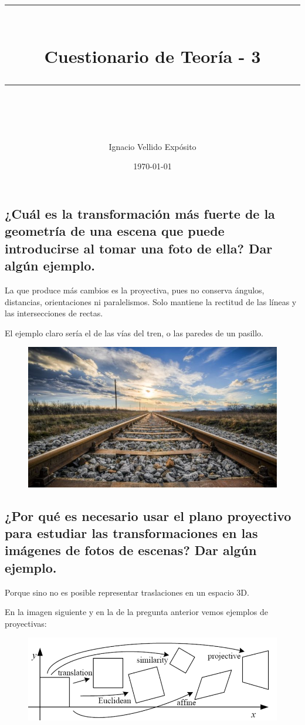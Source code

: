 \documentclass[11pt]{scrartcl} %
\title{	
	\normalfont\normalsize	
	\rule{\linewidth}{0.5pt}\\ %
	\vspace{20pt} %
	{\huge Cuestionario de Teoría - 3}\\ %
	\vspace{12pt} %
	\rule{\linewidth}{2pt}\\ %
	\vspace{12pt} %
}
\author{\LARGE Ignacio Vellido Expósito} %
\date{\normalsize\today} %
\begin{document}
\maketitle %

\subsection{¿Cuál es la transformación más fuerte de la geometría de una escena 
que puede introducirse al tomar una foto de ella? Dar algún ejemplo.}


La que produce más cambios es la proyectiva, pues no conserva ángulos, 
distancias, orientaciones ni paralelismos. 
Solo mantiene la rectitud de las líneas y las intersecciones de rectas. \newline

El ejemplo claro sería el de las vías del tren, o las paredes de un pasillo.

\begin{figure}[h]
	\centering
	\includegraphics[width=0.5\columnwidth]{1.jpeg}
\end{figure}

\subsection{¿Por qué es necesario usar el plano proyectivo para estudiar las 
transformaciones en las imágenes de fotos de escenas? Dar algún ejemplo.}


Porque sino no es posible representar traslaciones en un espacio 3D. \newline

En la imagen siguiente y en la de la pregunta anterior vemos ejemplos de proyectivas:

\begin{figure}[h]
	\centering
	\includegraphics[width=0.7\columnwidth]{5.png}
\end{figure}
\end{document}
